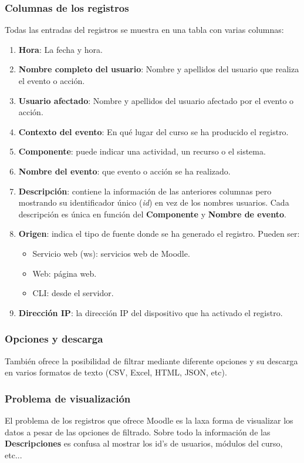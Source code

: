 \subsubsection{Columnas de los registros}
Todas las entradas del registros se muestra en una tabla con varias columnas: 
\begin{enumerate}
	\item \textbf{Hora}: La fecha y hora.
	\item \textbf{Nombre completo del usuario}: Nombre y apellidos del usuario que realiza el evento o acción.
	\item \textbf{Usuario afectado}: Nombre y apellidos del usuario afectado por el evento o acción.
	\item \textbf{Contexto del evento}: En qué lugar del curso se ha producido el registro.
	\item \textbf{Componente}: puede indicar una actividad, un recurso o el sistema.
	\item \textbf{Nombre del evento}: que evento o acción se ha realizado.
	\item \textbf{Descripción}: contiene la información de las anteriores columnas pero mostrando su identificador único (\textit{id}) en vez de los nombres usuarios. Cada descripción es única en función del \textbf{Componente} y \textbf{Nombre de evento}.
	\item \textbf{Origen}: indica el tipo de fuente donde se ha generado el registro. Pueden ser:
	\begin{itemize}
		\item Servicio web (ws): servicios web de Moodle.
		\item Web: página web.
		\item CLI: desde el servidor.
	\end{itemize}
	\item \textbf{Dirección IP}: la dirección IP del dispositivo que ha activado el registro.
	
\end{enumerate}

\subsubsection{Opciones y descarga}
También ofrece la posibilidad de filtrar mediante diferente opciones y su descarga en varios formatos de texto (CSV, Excel, HTML, JSON, etc).

\subsubsection{Problema de visualización}

El problema de los registros que ofrece Moodle es la laxa forma de visualizar los datos a pesar de las opciones de filtrado. Sobre todo la información de las \textbf{Descripciones} es confusa al mostrar los id's de usuarios, módulos del curso, etc...




